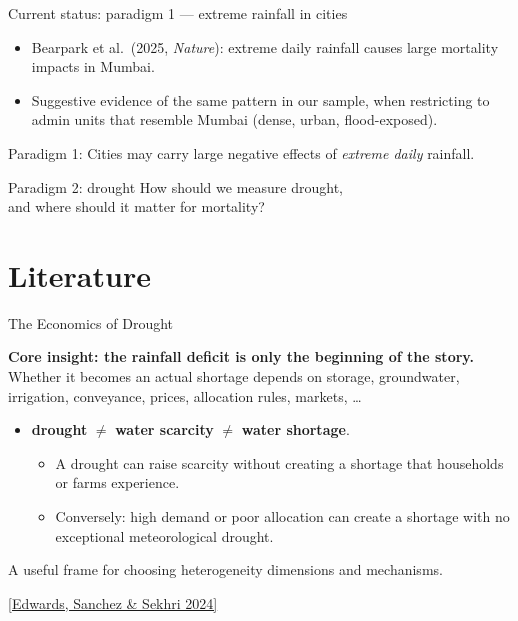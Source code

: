 \documentclass[10pt, aspectratio=169]{beamer}
\newcommand{\paperlink}[2]{\href{#1}{\textcolor{blue!50!black}{\footnotesize [#2]}}}
\begin{document}
\begin{frame}{Current status: paradigm 1 --- extreme rainfall in cities}
  \begin{itemize}
    \item Bearpark et al.\ (2025, \emph{Nature}): extreme daily rainfall causes large mortality impacts in Mumbai.
    \item Suggestive evidence of the same pattern in our sample, when restricting to admin units that resemble Mumbai (dense, urban, flood-exposed).
  \end{itemize}
  \vspace{2em}
  Paradigm 1: Cities may carry large negative effects of \emph{extreme daily} rainfall.
\end{frame}

\begin{frame}{Paradigm 2: drought}
  \vfill
  \centering
  {\Large How should we measure drought,\\[0.3em]
  and where should it matter for mortality?}
  \vfill
\end{frame}

\section{Literature}

\begin{frame}{The Economics of Drought}
    
  \textbf{Core insight: the rainfall deficit is only the beginning of the story.}
  Whether it becomes an actual shortage depends on storage, groundwater,
  irrigation, conveyance, prices, allocation rules, markets, \ldots
  \vspace{0.6em}
  \begin{itemize}
    \item \textbf{drought} $\neq$ \textbf{water scarcity} $\neq$ \textbf{water shortage}.
    \begin{itemize}
      \item A drought can raise scarcity without creating a shortage that households or farms experience.
      \item Conversely: high demand or poor allocation can create a shortage with no exceptional meteorological drought.
    \end{itemize}
  \end{itemize}
  \vspace{1em}
  A useful frame for choosing heterogeneity dimensions and mechanisms.

  \vfill
  \paperlink{https://doi.org/10.1146/annurev-resource-101623-100253}{Edwards, Sanchez \& Sekhri 2024}\\
\end{frame}
\end{document}
